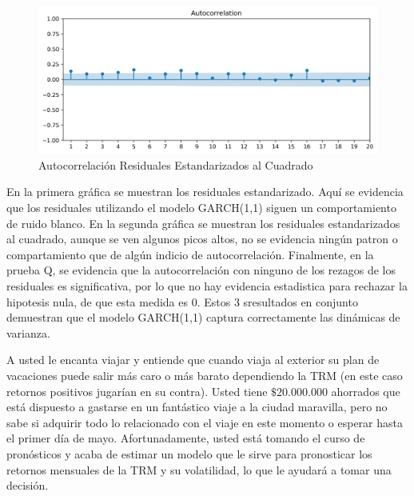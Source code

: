 \documentclass{article}
\theoremstyle{remark}
\theoremstyle{definition}
\begin{document}
\begin{enumerate}[label = \emph{\alph*})]
\begin{tcolorbox}[title=Soluci\'on 2.g]
            \begin{figure}[H]
                \centering
                \includegraphics[width=0.9\linewidth]{output/acf_residuales2.png}
                \caption{Autocorrelaci\'on Residuales Estandarizados al Cuadrado}
                \label{fig:graf_residstd2}
            \end{figure}
            
            

            En la primera gr\'afica se muestran los residuales estandarizado. Aqu\'i se evidencia que los residuales utilizando el modelo GARCH(1,1) siguen un comportamiento de ruido blanco. En la segunda gr\'afica se muestran los residuales estandarizados al cuadrado, aunque se ven algunos picos altos, no se evidencia ning\'un patron o compartamiento que de alg\'un indicio de autocorrelaci\'on. Finalmente, en la prueba Q, se evidencia que la autocorrelaci\'on con ninguno de los rezagos de los residuales es significativa, por lo que no hay evidencia estadistica para rechazar la hipotesis nula, de que esta medida es 0. Estos 3 sresultados en conjunto demuestran que el modelo GARCH(1,1) captura correctamente las din\'amicas de varianza.
            
        \end{tcolorbox}
\end{enumerate}

{A usted le encanta viajar y entiende que cuando viaja al exterior su plan de vacaciones puede salir m\'as caro o m\'as barato dependiendo la TRM (en este caso retornos positivos jugar\'ian en su contra). Usted tiene $\$20.000.000$ ahorrados que est\'a dispuesto a gastarse en un fant\'astico viaje a la ciudad maravilla, pero no sabe si adquirir todo lo relacionado con el viaje en este momento o esperar hasta el primer d\'ia de mayo. Afortunadamente, usted est\'a tomando el curso de pron\'osticos y acaba de estimar un modelo que le sirve para pronosticar los retornos mensuales de la TRM y su volatilidad, lo que le ayudar\'a a tomar una decisi\'on.}
\end{document}
